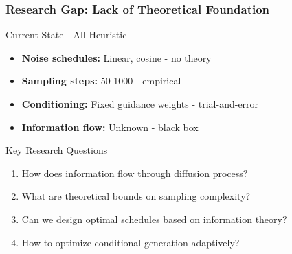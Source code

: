 \documentclass[aspectratio=169]{beamer}
\begin{document}
\begin{frame}
\frametitle{Research Gap: Lack of Theoretical Foundation}
\begin{block}{Current State - All Heuristic}
\begin{itemize}
\item \textbf{Noise schedules:} Linear, cosine - \textcolor{myred}{no theory}
\item \textbf{Sampling steps:} 50-1000 - \textcolor{myred}{empirical}
\item \textbf{Conditioning:} Fixed guidance weights - \textcolor{myred}{trial-and-error}
\item \textbf{Information flow:} Unknown - \textcolor{myred}{black box}
\end{itemize}
\end{block}

\vspace{0.5cm}
\begin{alertblock}{Key Research Questions}
\begin{enumerate}
\item How does information flow through diffusion process?
\item What are theoretical bounds on sampling complexity?
\item Can we design optimal schedules based on information theory?
\item How to optimize conditional generation adaptively?
\end{enumerate}
\end{alertblock}
\end{frame}
\end{document}
